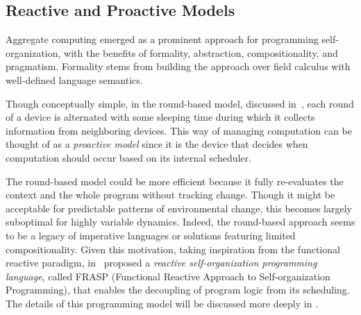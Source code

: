 \subsection{Reactive and Proactive Models}
\label{subsection:reactive-and-proactive-models}

Aggregate computing emerged as a prominent approach for programming self-organization, with the benefits of formality, abstraction, compositionality, and pragmatism. Formality stems from building the approach over field calculus with well-defined language semantics. 

Though conceptually simple, in the round-based model, discussed in~\cite{Viroli2018}, each round of a device is alternated with some sleeping time during which it collects information from neighboring devices. This way of managing computation can be thought of as a \textit{proactive model} since it is the device that decides when computation should occur based on its internal scheduler.

The round-based model could be more efficient because it fully re-evaluates the context and the whole program without tracking change. Though it might be acceptable for predictable patterns of environmental change, this becomes largely suboptimal for highly variable dynamics. Indeed, the round-based approach seems to be a legacy of imperative languages or solutions featuring limited compositionality. Given this motivation, taking inspiration from the functional reactive paradigm, in~\cite{Casadei2023} proposed a \textit{reactive self-organization programming language}, called FRASP (Functional Reactive Approach to Self-organization Programming), that enables the decoupling of program logic from its scheduling. The details of this programming model will be discussed more deeply in .